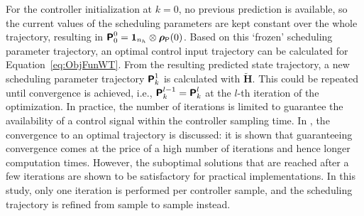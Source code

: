 For the controller initialization at $k = 0$, no previous prediction is available, so the current values of the scheduling parameters are kept constant over the whole trajectory, resulting in $\bm{\mathsf{P}}_0^0 = \bm{1}_{n_h} \otimes \bm{\rho}_{\mathsf{P}}(0)$. Based on this `frozen' scheduling parameter trajectory, an optimal control input trajectory can be calculated for Equation~\eqref{eq:ObjFunWT}. From the resulting predicted state trajectory, a new scheduling parameter trajectory $\bm{\mathsf{P}}_k^{1}$ is calculated with $\tilde{\bm{H}}$. This could be repeated until convergence is achieved, i.e., $\bm{\mathsf{P}}_k^{l-1} = \bm{\mathsf{P}}_k^l$ at the $l$-th iteration of the optimization. In practice, the number of iterations is limited to guarantee the availability of a control signal within the controller sampling time. In \cite{hespe2021convergence}, the convergence to an optimal trajectory is discussed: it is shown that guaranteeing convergence comes at the price of a high number of iterations and hence longer computation times. However, the suboptimal solutions that are reached after a few iterations are shown to be satisfactory for practical implementations. In this study, only one iteration is performed per controller sample, and the scheduling trajectory is refined from sample to sample instead.

